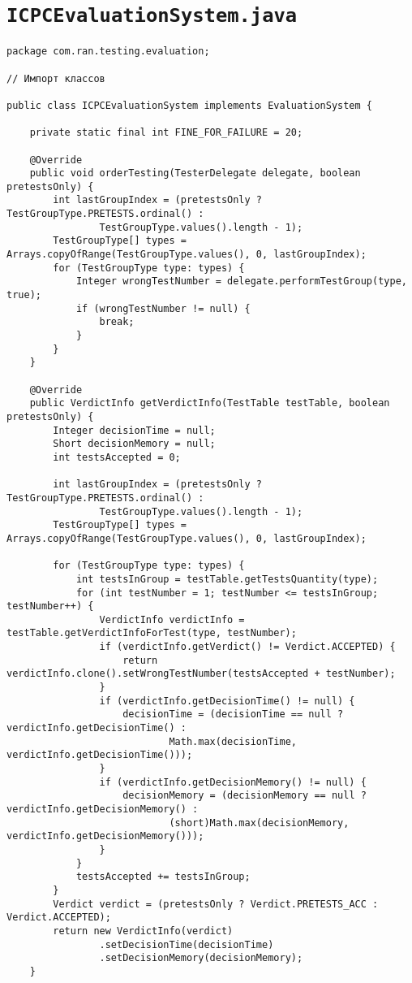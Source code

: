 \section*{\texttt{ICPCEvaluationSystem.java}}
\begin{verbatim}
package com.ran.testing.evaluation;

// Импорт классов

public class ICPCEvaluationSystem implements EvaluationSystem {

    private static final int FINE_FOR_FAILURE = 20;
    
    @Override
    public void orderTesting(TesterDelegate delegate, boolean pretestsOnly) {
        int lastGroupIndex = (pretestsOnly ? TestGroupType.PRETESTS.ordinal() :
                TestGroupType.values().length - 1);
        TestGroupType[] types = Arrays.copyOfRange(TestGroupType.values(), 0, lastGroupIndex);
        for (TestGroupType type: types) {
            Integer wrongTestNumber = delegate.performTestGroup(type, true);
            if (wrongTestNumber != null) {
                break;
            }
        }
    }
    
    @Override
    public VerdictInfo getVerdictInfo(TestTable testTable, boolean pretestsOnly) {
        Integer decisionTime = null;
        Short decisionMemory = null;
        int testsAccepted = 0;
        
        int lastGroupIndex = (pretestsOnly ? TestGroupType.PRETESTS.ordinal() :
                TestGroupType.values().length - 1);
        TestGroupType[] types = Arrays.copyOfRange(TestGroupType.values(), 0, lastGroupIndex);
        
        for (TestGroupType type: types) {
            int testsInGroup = testTable.getTestsQuantity(type);
            for (int testNumber = 1; testNumber <= testsInGroup; testNumber++) {
                VerdictInfo verdictInfo = testTable.getVerdictInfoForTest(type, testNumber);
                if (verdictInfo.getVerdict() != Verdict.ACCEPTED) {
                    return verdictInfo.clone().setWrongTestNumber(testsAccepted + testNumber);
                }
                if (verdictInfo.getDecisionTime() != null) {
                    decisionTime = (decisionTime == null ? verdictInfo.getDecisionTime() :
                            Math.max(decisionTime, verdictInfo.getDecisionTime()));
                }
                if (verdictInfo.getDecisionMemory() != null) {
                    decisionMemory = (decisionMemory == null ? verdictInfo.getDecisionMemory() :
                            (short)Math.max(decisionMemory, verdictInfo.getDecisionMemory()));
                }
            }
            testsAccepted += testsInGroup;
        }
        Verdict verdict = (pretestsOnly ? Verdict.PRETESTS_ACC : Verdict.ACCEPTED);
        return new VerdictInfo(verdict)
                .setDecisionTime(decisionTime)
                .setDecisionMemory(decisionMemory);
    }


\end{verbatim}
